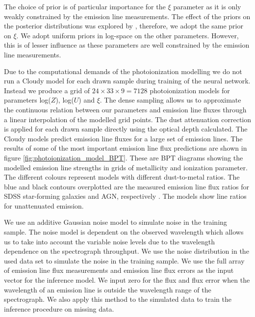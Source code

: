 \documentclass[fleqn,usenatbib]{mnras}
\begin{document}
The choice of prior is of particular importance for the $\xi$ parameter as it is only weakly constrained by the emission line measurements. The effect of the priors on the posterior distributions was explored by \cite{brinchmann2013}, therefore, we adopt the same prior on $\xi$. We adopt uniform priors in log-space on the other parameters. However, this is of lesser influence as these parameters are well constrained by the emission line measurements.

Due to the computational demands of the photoionization modelling we do not run a Cloudy model for each drawn sample during training of the neural network. Instead we produce a grid of $24 \times 33 \times 9 = 7128$ photoionization models for parameters log($Z$), log($U$) and $\xi$. The dense sampling allows us to approximate the continuous relation between our parameters and emission line fluxes through a linear interpolation of the modelled grid points. The dust attenuation correction is applied for each drawn sample directly using the optical depth calculated. The Cloudy models predict emission line fluxes for a large set of emission lines. The results of some of the most important emission line flux predictions are shown in figure \ref{fig:photoionization_model_BPT}. These are BPT diagrams \citep{baldwin1981} showing the modelled emission line strengths in grids of metallicity and ionization parameter. The different colours represent models with different dust-to-metal ratios. The blue and black contours overplotted are the measured emission line flux ratios for SDSS star-forming galaxies and AGN, respectively \citep{brinchmann2004, kauffmann2003, tremonti2004}. The models show line ratios for unattenuated emission.

We use an additive Gaussian noise model to simulate noise in the training sample. The noise model is dependent on the observed wavelength which allows us to take into account the variable noise levels due to the wavelength dependence on the spectrograph throughput. We use the noise distribution in the used data set to simulate the noise in the training sample. We use the full array of emission line flux measurements and emission line flux errors as the input vector for the inference model. We input zero for the flux and flux error when the wavelength of an emission line is outside the wavelength range of the spectrograph. We also apply this method to the simulated data to train the inference procedure on missing data. 
\end{document}
